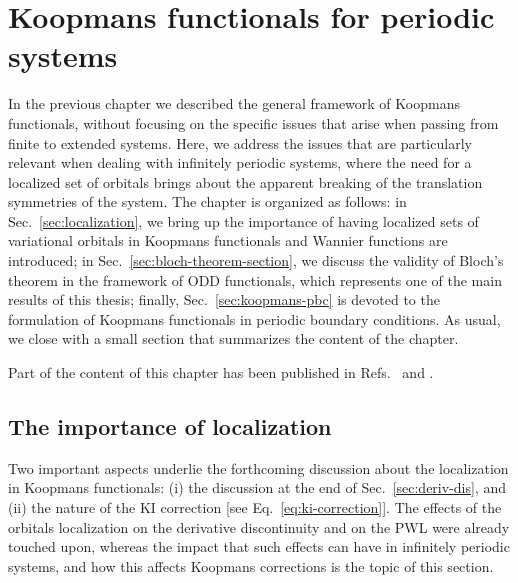 \cleardoublepage
\chapter{Koopmans functionals for periodic systems\label{ch:koopmans-periodic}}
In the previous chapter we described the general framework of Koopmans functionals, without focusing on the specific issues that arise when passing from finite to extended systems. Here, we address the issues that are particularly relevant when dealing with infinitely periodic systems, where the need for a localized set of orbitals brings about the apparent breaking of the translation symmetries of the system. The chapter is organized as follows: in Sec.~\ref{sec:localization}, we bring up the importance of having localized sets of variational orbitals in Koopmans functionals and Wannier functions are introduced; in Sec.~\ref{sec:bloch-theorem-section}, we discuss the validity of Bloch's theorem in the framework of ODD functionals, which represents one of the main results of this thesis; finally, Sec.~\ref{sec:koopmans-pbc} is devoted to the formulation of Koopmans functionals in periodic boundary conditions. As usual, we close with a small section that summarizes the content of the chapter.

Part of the content of this chapter has been published in Refs.~\cite{de_gennaro_blochs_2022} and \cite{colonna_koopmans_2022}.

\clearpage
\section{The importance of localization\label{sec:localization}}
Two important aspects underlie the forthcoming discussion about the localization in Koopmans functionals: (i) the discussion at the end of Sec.~\ref{sec:deriv-dis}, and (ii) the nature of the KI correction [see Eq.~\eqref{eq:ki-correction}]. The effects of the orbitals localization on the derivative discontinuity and on the PWL were already touched upon, whereas the impact that such effects can have in infinitely periodic systems, and how this affects Koopmans corrections is the topic of this section.

